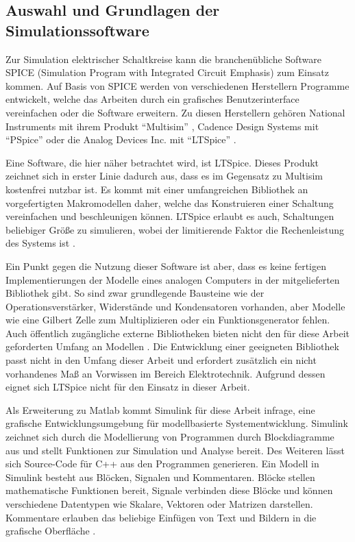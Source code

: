 \subsection{Auswahl und Grundlagen der Simulationssoftware}
\label{chap:Auswahl und Grundlagen der Simulationssoftware}

Zur Simulation elektrischer Schaltkreise kann die branchenübliche Software SPICE (Simulation Program with Integrated Circuit Emphasis) zum Einsatz kommen. Auf Basis von SPICE werden von verschiedenen Herstellern Programme entwickelt, welche das Arbeiten durch \zbol ein grafisches Benutzerinterface vereinfachen oder die Software erweitern. Zu diesen Herstellern gehören \ua National Instruments mit ihrem Produkt "`Multisim"' \cite{NIMultisim}, Cadence Design Systems mit "`PSpice"' \cite{CadencePSpice} oder die Analog Devices Inc. mit "`LTSpice"' \cite{AnalogDevicesLTSpice}.

Eine Software, die hier näher betrachtet wird, ist LTSpice. Dieses Produkt zeichnet sich in erster Linie dadurch aus, dass es im Gegensatz zu \zbol Multisim kostenfrei nutzbar ist. Es kommt mit einer umfangreichen Bibliothek an vorgefertigten Makromodellen daher, welche das Konstruieren einer Schaltung vereinfachen und beschleunigen können. LTSpice erlaubt es auch, Schaltungen beliebiger Größe zu simulieren, wobei der limitierende Faktor die Rechenleistung des Systems ist \cite{Alonso2019}.

Ein Punkt gegen die Nutzung dieser Software ist aber, dass es keine fertigen Implementierungen der Modelle eines analogen Computers in der mitgelieferten Bibliothek gibt. So sind zwar grundlegende Bausteine wie der Operationsverstärker, Widerstände und Kondensatoren vorhanden, aber Modelle wie eine Gilbert Zelle zum Multiplizieren oder ein Funktionsgenerator fehlen. Auch öffentlich zugängliche externe Bibliotheken bieten nicht den für diese Arbeit geforderten Umfang an Modellen \cite[vgl.]{MaffeiLTSpiceAnalogComputer}. Die Entwicklung einer geeigneten Bibliothek passt nicht in den Umfang dieser Arbeit und erfordert zusätzlich ein nicht vorhandenes Maß an Vorwissen im Bereich Elektrotechnik. Aufgrund dessen eignet sich LTSpice nicht für den Einsatz in dieser Arbeit.

Als Erweiterung zu Matlab kommt Simulink für diese Arbeit infrage, eine grafische Entwicklungsumgebung für modellbasierte Systementwicklung. Simulink zeichnet sich durch die Modellierung von Programmen durch Blockdiagramme aus und stellt Funktionen zur Simulation und Analyse bereit. Des Weiteren lässt sich Source-Code für \zb C++ aus den Programmen generieren. Ein Modell in Simulink besteht aus Blöcken, Signalen und Kommentaren. Blöcke stellen mathematische Funktionen bereit, Signale verbinden diese Blöcke und können verschiedene Datentypen wie Skalare, Vektoren oder Matrizen darstellen. Kommentare erlauben das beliebige Einfügen von Text und Bildern in die grafische Oberfläche \cite{Peasley2018}.

